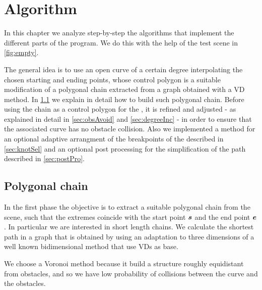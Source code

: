 \documentclass[dissertation.tex]{subfiles}
\begin{document}
\chapter{Algorithm}\label{cha:algorithm}
In this chapter we analyze step-by-step the algorithms that implement
the different parts of the program. We do this with the help of the
test scene in \cref{fig:empty}.

The general idea is to use an open \bs curve of a certain degree
interpolating the chosen starting and ending points, whose
control polygon is a suitable modification of a polygonal chain
extracted from a graph
obtained with a \ac{VD} method. In \cref{sec:polChain} we
explain in detail how to
build such polygonal chain. Before using the chain as a control
polygon for the \bs, it is refined and adjusted - as explained in
detail in \cref{sec:obsAvoid} and \cref{sec:degreeInc} - in order to
ensure that the associated \bs curve has no obstacle
collision. Also we implemented a method for an optional adaptive
arrangment of the breakpoints of the \bs described in
\cref{sec:knotSel} and an optional post processing for the
simplification of the path described in \cref{sec:postPro}.
\section{Polygonal chain}\label{sec:polChain}
In the first phase the objective is to extract a suitable polygonal chain from
the scene, such that the extremes coincide with the start point $\boldsymbol{s}$
and the end point $\boldsymbol{e}$. In particular we are interested in short length
chains. We calculate the shortest path
in a graph that is obtained by using an adaptation to three
dimensions of a well known bidimensional method
\cite{bhattacharya}\cite{ho-liu}\cite{seda-pich} that use
\acp{VD} as base.

We choose a Voronoi method because it build a structure roughly
equidistant from obstacles, and so we have low probability of
collisions between the curve and the obstacles.
\end{document}
